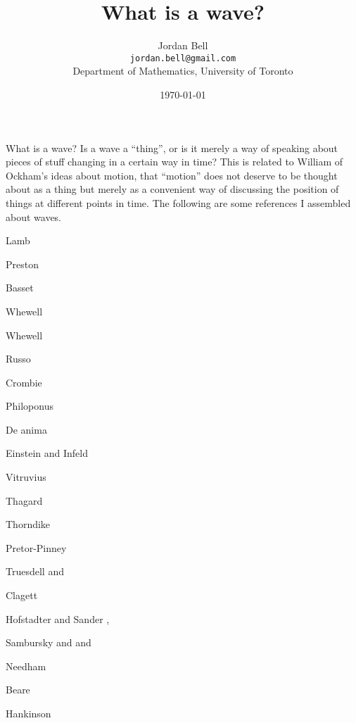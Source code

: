 \documentclass{article}
\theoremstyle{definition}
\begin{document}
\title{What is a wave?}
\author{Jordan Bell\\ \texttt{jordan.bell@gmail.com}\\Department of Mathematics, University of Toronto}
\date{\today}

\maketitle

What is a wave? Is a wave a ``thing'', or is it merely a way of speaking about pieces of stuff changing in a certain way in time? This is related to William of Ockham's ideas
about motion, that ``motion'' does not deserve to be thought about as a thing but merely as a convenient way of discussing the position of things at different points in time. The following
are some references I assembled about waves.

Lamb \cite[p.~369, \S 236]{lamb}

Preston \cite[p.~412, \S 289]{preston}

Basset \cite[p.~163, \S 405]{basset} 

Whewell \cite[Book IV]{whewellI}

Whewell \cite[Book VIII]{whewellII}

Russo \cite[p.~229]{russo}

Crombie \cite[p.~126]{crombie}

Philoponus \cite[p.~149]{philoponus}

De anima \cite[\S 447]{deanima}

Einstein and Infeld \cite[p.~100]{einstein}

Vitruvius \cite[p.~11]{mental}

Thagard \cite[p.~39]{thagard1993}

Thorndike \cite[p.~32]{thorndikeII}

Pretor-Pinney \cite[pp.~35, 81, 161, 269]{pretor-pinney}

Truesdell \cite[p.~71]{truesdell} and \cite[pp.~CXXI--CXXIII]{II12}

Clagett \cite[p.~74]{clagett}

Hofstadter and Sander \cite[p.~209]{hofstadter},

Sambursky \cite[pp.~138--141]{sambursky1960} and \cite[pp.~89, 100--104]{sambursky1962} and \cite[p.~22--29]{sambursky1959}

Needham \cite[pp.~8-10]{needhamIV1}

Beare \cite[pp.~93--95]{beare}

Hankinson \cite[p.~240]{hankinson}

\nocite{*}



\end{document}
